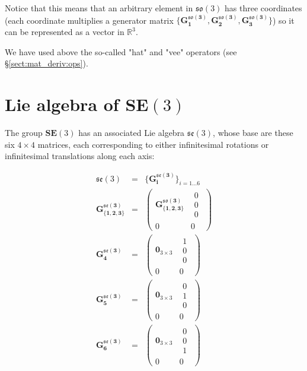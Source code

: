 \documentclass[a4paper,11pt]{report}
\begin{document}
Notice that this means that an arbitrary element in $\mathfrak{so}(3)$
has three coordinates (each coordinate multiplies a generator
matrix $\{  \mathbf{G^{\mathfrak{so}(3)}_1}, \mathbf{G^{\mathfrak{so}(3)}_2}, \mathbf{G^{\mathfrak{so}(3)}_3} \}$) so it can
be represented as a vector in $\mathbb{R}^3$.

We have used above the so-called "hat" and "vee" operators (see \S\ref{sect:mat_deriv:ops}).


\section{Lie algebra of $\mathbf{SE}(3)$}

The group $\mathbf{SE}(3)$ has an associated Lie algebra $\mathfrak{se}(3)$,
whose base are these six $4 \times 4$ matrices, each corresponding to
either infinitesimal rotations or infinitesimal translations along each axis:

\begin{eqnarray}
\mathfrak{se}(3) &=& \{  \mathbf{G^{\mathfrak{se}(3)}_i} \}_{i=1...6}  \\
\mathbf{G^{\mathfrak{se}(3)}_{\{1,2,3\}} } &=&
\left(
\begin{array}{c|c}
 \mathbf{G^{\mathfrak{so}(3)}_{\{1,2,3\}} } & \begin{array}{c} 0 \\0 \\0 \end{array} \\
\hline    0 & 0
\end{array}
\right)
\\
\mathbf{G^{\mathfrak{se}(3)}_4 } &=&
\left(
\begin{array}{c|c}
 \mathbf{0}_{3\times 3} & \begin{array}{c} 1 \\0 \\0 \end{array} \\
\hline    0 & 0
\end{array}
\right)
\\
\mathbf{G^{\mathfrak{se}(3)}_5 } &=&
\left(
\begin{array}{c|c}
 \mathbf{0}_{3\times 3} & \begin{array}{c} 0 \\1 \\0 \end{array} \\
\hline    0 & 0
\end{array}
\right)
\\
\mathbf{G^{\mathfrak{se}(3)}_6 } &=&
\left(
\begin{array}{c|c}
 \mathbf{0}_{3\times 3} & \begin{array}{c} 0 \\0 \\1 \end{array} \\
\hline    0 & 0
\end{array}
\right)
\end{eqnarray}
\end{document}

